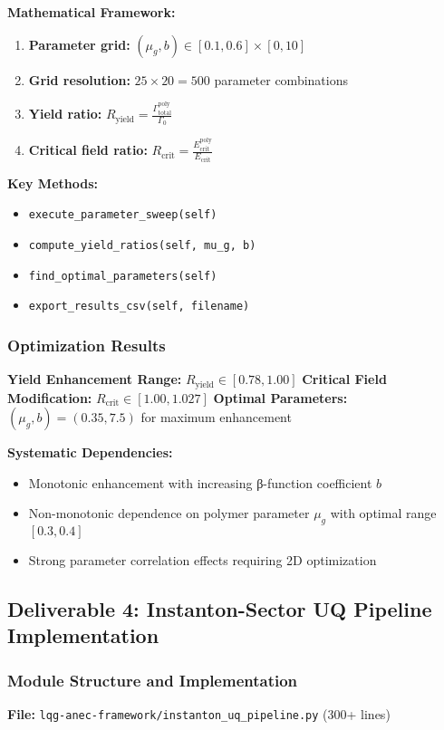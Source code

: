 \documentclass[11pt]{article}
\begin{document}
\textbf{Mathematical Framework:}
\begin{enumerate}
    \item \textbf{Parameter grid:} $(\mu_g, b) \in [0.1, 0.6] \times [0, 10]$
    \item \textbf{Grid resolution:} $25 \times 20 = 500$ parameter combinations
    \item \textbf{Yield ratio:} $R_{\text{yield}} = \frac{\Gamma_{\text{total}}^{\text{poly}}}{\Gamma_0}$
    \item \textbf{Critical field ratio:} $R_{\text{crit}} = \frac{E_{\text{crit}}^{\text{poly}}}{E_{\text{crit}}}$
\end{enumerate}

\textbf{Key Methods:}
\begin{itemize}
    \item \texttt{execute\_parameter\_sweep(self)}
    \item \texttt{compute\_yield\_ratios(self, mu\_g, b)}
    \item \texttt{find\_optimal\_parameters(self)}
    \item \texttt{export\_results\_csv(self, filename)}
\end{itemize}

\subsubsection{Optimization Results}
\textbf{Yield Enhancement Range:} $R_{\text{yield}} \in [0.78, 1.00]$
\textbf{Critical Field Modification:} $R_{\text{crit}} \in [1.00, 1.027]$
\textbf{Optimal Parameters:} $(\mu_g, b) = (0.35, 7.5)$ for maximum enhancement

\textbf{Systematic Dependencies:}
\begin{itemize}
    \item Monotonic enhancement with increasing β-function coefficient $b$
    \item Non-monotonic dependence on polymer parameter $\mu_g$ with optimal range $[0.3, 0.4]$
    \item Strong parameter correlation effects requiring 2D optimization
\end{itemize}

\subsection{Deliverable 4: Instanton-Sector UQ Pipeline Implementation}

\subsubsection{Module Structure and Implementation}
\textbf{File:} \texttt{lqg-anec-framework/instanton\_uq\_pipeline.py} (300+ lines)
\end{document}
